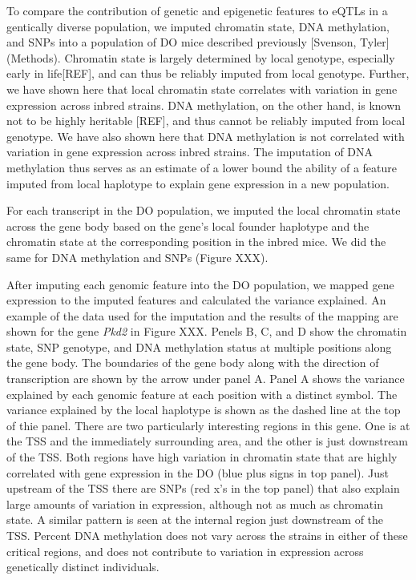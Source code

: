 \documentclass[10pt,letterpaper]{article}
\begin{document}
To compare the contribution of genetic and epigenetic features to eQTLs
in a gentically diverse population, we imputed chromatin state, DNA
methylation, and SNPs into a population of DO mice described previously
{[}Svenson, Tyler{]} (Methods). Chromatin state is largely determined by
local genotype, especially early in life{[}REF{]}, and can thus be
reliably imputed from local genotype. Further, we have shown here that
local chromatin state correlates with variation in gene expression
across inbred strains. DNA methylation, on the other hand, is known not
to be highly heritable {[}REF{]}, and thus cannot be reliably imputed
from local genotype. We have also shown here that DNA methylation is not
correlated with variation in gene expression across inbred strains. The
imputation of DNA methylation thus serves as an estimate of a lower
bound the ability of a feature imputed from local haplotype to explain
gene expression in a new population.

For each transcript in the DO population, we imputed the local chromatin
state across the gene body based on the gene's local founder haplotype
and the chromatin state at the corresponding position in the inbred
mice. We did the same for DNA methylation and SNPs (Figure XXX).

After imputing each genomic feature into the DO population, we mapped
gene expression to the imputed features and calculated the variance
explained. An example of the data used for the imputation and the
results of the mapping are shown for the gene \textit{Pkd2} in Figure
XXX. Penels B, C, and D show the chromatin state, SNP genotype, and DNA
methylation status at multiple positions along the gene body. The
boundaries of the gene body along with the direction of transcription
are shown by the arrow under panel A. Panel A shows the variance
explained by each genomic feature at each position with a distinct
symbol. The variance explained by the local haplotype is shown as the
dashed line at the top of thie panel. There are two particularly
interesting regions in this gene. One is at the TSS and the immediately
surrounding area, and the other is just downstream of the TSS. Both
regions have high variation in chromatin state that are highly
correlated with gene expression in the DO (blue plus signs in top
panel). Just upstream of the TSS there are SNPs (red x's in the top
panel) that also explain large amounts of variation in expression,
although not as much as chromatin state. A similar pattern is seen at
the internal region just downstream of the TSS. Percent DNA methylation
does not vary across the strains in either of these critical regions,
and does not contribute to variation in expression across genetically
distinct individuals.
\end{document}
